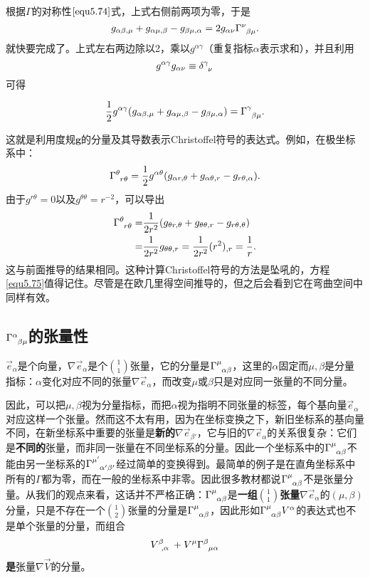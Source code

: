 根据$\Gamma$的对称性$\eqref{equ5.74}$式，上式右侧前两项为零，于是
\[
    g_{\alpha \beta, \mu} + g_{\alpha \mu, \beta} - g_{\beta \mu, \alpha} = 2 g_{\alpha \nu} \Gamma\indices{^\nu_{\beta \mu}}.
\]
就快要完成了。上式左右两边除以2，乘以$g^{\alpha \gamma}$（重复指标$\alpha$表示求和），并且利用
\[
    g^{\alpha \gamma} g_{\alpha \nu} \equiv \delta\indices{^\gamma_\nu}
\]
可得
\begin{shaded}
\begin{equation}
    \frac{1}{2} g^{\alpha \gamma} (g_{\alpha \beta, \mu} + g_{\alpha \mu, \beta} - g_{\beta \mu, \alpha}  ) = \Gamma\indices{^\gamma_{\beta \mu}}.
\label{equ5.75}
\end{equation}
\end{shaded}
这就是利用度规$\mathbf{g}$的分量及其导数表示Christoffel符号的表达式。例如，在极坐标系中：
\[
    \Gamma\indices{^\theta_{r \theta}} = \frac{1}{2} g^{\alpha \theta} (g_{\alpha r, \theta} + g_{\alpha \theta, r} - g_{r \theta, \alpha}).
\]
由于$g^{r \theta} = 0$以及$g^{\theta \theta} = r^{-2}$，可以导出
\begin{align*}
    \Gamma\indices{^\theta_{r \theta}} =& \frac{1}{2r^2} (g_{\theta r, \theta} + g_{\theta \theta, r} - g_{r \theta, \theta}) \\
    =& \frac{1}{2r^2} g_{\theta \theta, r} = \frac{1}{2r^2} (r^2)_{, r} = \frac{1}{r}.
\end{align*}
这与前面推导的结果相同。这种计算Christoffel符号的方法是坠吼的，方程\eqref{equ5.75}值得记住。尽管是在欧几里得空间推导的，但之后会看到它在弯曲空间中同样有效。


\subsection*{$\Gamma\indices{^\alpha_{\beta \mu}}$的张量性}
$\vec{e}_\alpha$是个向量，$\nabla \vec{e}_\alpha$是个$\binom{1}{1}$张量，它的分量是$\Gamma\indices{^\mu_{\alpha \beta}}$，这里的$\alpha$固定而$\mu, \beta$是分量指标：$\alpha$变化对应不同的张量$\nabla \vec{e}_\alpha$，而改变$\mu$或$\beta$只是对应同一张量的不同分量。

因此，可以把$\mu, \beta$视为分量指标，而把$\alpha$视为指明不同张量的标签，每个基向量$\vec{e}_\alpha$对应这样一个张量。然而这不太有用，因为在坐标变换之下，新旧坐标系的基向量不同，在新坐标系中重要的张量是\textbf{新的}$\nabla \vec{e}_{\beta'}$，它与旧的$\nabla \vec{e}_\alpha$的关系很复杂：它们是\textbf{不同的}张量，而非同一张量在不同坐标系的分量。因此一个坐标系中的$\Gamma\indices{^\mu_{\alpha \beta}}$不能由另一坐标系的$\Gamma\indices{^{\mu'}_{\alpha'
 \beta'}}$经过简单的变换得到。最简单的例子是在直角坐标系中所有的$\Gamma$都为零，而在一般的坐标系中非零。因此很多教材都说$\Gamma\indices{^\mu_{\alpha \beta}}$不是张量分量。从我们的观点来看，这话并不严格正确：$\Gamma\indices{^\mu_{\alpha \beta}}$是\textbf{一组}$\binom{1}{1}$\textbf{张量}$\nabla \vec{e}_\alpha$的$(\mu, \beta)$分量，只是不存在一个$\binom{1}{2}$张量的分量是$\Gamma\indices{^\mu_{\alpha \beta}}$，因此形如$\Gamma\indices{^\mu_{\alpha \beta}} V^\alpha $的表达式也不是单个张量的分量，而组合
 \[
    V\indices{^\beta_{, \alpha}} + V^\mu \Gamma\indices{^\beta_{\mu \alpha}}
\]
\textbf{是}张量$\nabla \vec{V}$的分量。




